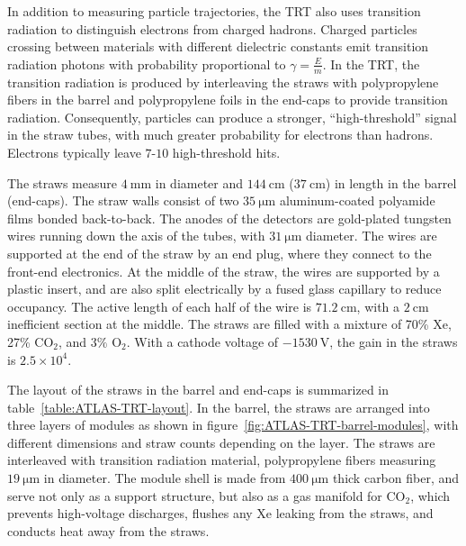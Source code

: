 In addition to measuring particle trajectories, the TRT also uses transition radiation to distinguish electrons from charged hadrons. Charged particles crossing between materials with different dielectric constants emit transition radiation photons with probability proportional to $\gamma=\frac{E}{m}$. In the TRT, the transition radiation is produced by interleaving the straws with polypropylene fibers in the barrel and polypropylene foils in the end-caps to provide transition radiation. Consequently, particles can produce a stronger, ``high-threshold'' signal in the straw tubes, with much greater probability for electrons than hadrons.  Electrons typically leave $7$-$10$ high-threshold hits. 

The straws measure $\SI{4}{\milli\meter}$ in diameter and $\SI{144}{\centi\meter}$ ($\SI{37}{\centi\meter}$) in length in the barrel (end-caps). The straw walls consist of two $\SI{35}{\micro\meter}$ aluminum-coated polyamide films bonded back-to-back.
The anodes of the detectors are gold-plated tungsten wires running down the axis of the tubes, with $\SI{31}{\micro\meter}$ diameter.
The wires are supported at the end of the straw by an end plug, where they connect to the front-end electronics. At the middle of the straw, the wires are supported by a plastic insert, and are also split electrically by a fused glass capillary to reduce occupancy. The active length of each half of the wire is $\SI{71.2}{\centi\meter}$, with a $\SI{2}{\centi\meter}$ inefficient section at the middle. 
The straws are filled with a mixture of 70\% Xe, 27\% CO$_2$, and $3\%$ O$_2$. With a cathode voltage of $\SI{-1530}{\volt}$, the gain in the straws is $2.5\times 10^4$.

The layout of the straws in the barrel and end-caps is summarized in table~\ref{table:ATLAS-TRT-layout}. In the barrel, the straws are arranged into three layers of modules as shown in figure~\ref{fig:ATLAS-TRT-barrel-modules}, with different dimensions and straw counts depending on the layer. The straws are interleaved with transition radiation material, polypropylene fibers measuring $\SI{19}{\micro\meter}$ in diameter. The module shell is made from $\SI{400}{\micro\meter}$ thick carbon fiber, and serve not only as a support structure, but also as a gas manifold for CO$_2$, which prevents high-voltage discharges, flushes any Xe leaking from the straws, and conducts heat away from the straws.  

